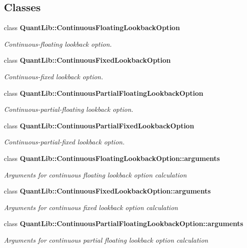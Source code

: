 \subsection*{Classes}
\begin{DoxyCompactItemize}
\item 
class {\bf Quant\+Lib\+::\+Continuous\+Floating\+Lookback\+Option}
\begin{DoxyCompactList}\small\item\em Continuous-\/floating lookback option. \end{DoxyCompactList}\item 
class {\bf Quant\+Lib\+::\+Continuous\+Fixed\+Lookback\+Option}
\begin{DoxyCompactList}\small\item\em Continuous-\/fixed lookback option. \end{DoxyCompactList}\item 
class {\bf Quant\+Lib\+::\+Continuous\+Partial\+Floating\+Lookback\+Option}
\begin{DoxyCompactList}\small\item\em Continuous-\/partial-\/floating lookback option. \end{DoxyCompactList}\item 
class {\bf Quant\+Lib\+::\+Continuous\+Partial\+Fixed\+Lookback\+Option}
\begin{DoxyCompactList}\small\item\em Continuous-\/partial-\/fixed lookback option. \end{DoxyCompactList}\item 
class {\bf Quant\+Lib\+::\+Continuous\+Floating\+Lookback\+Option\+::arguments}
\begin{DoxyCompactList}\small\item\em Arguments for continuous floating lookback option calculation \end{DoxyCompactList}\item 
class {\bf Quant\+Lib\+::\+Continuous\+Fixed\+Lookback\+Option\+::arguments}
\begin{DoxyCompactList}\small\item\em Arguments for continuous fixed lookback option calculation \end{DoxyCompactList}\item 
class {\bf Quant\+Lib\+::\+Continuous\+Partial\+Floating\+Lookback\+Option\+::arguments}
\begin{DoxyCompactList}\small\item\em Arguments for continuous partial floating lookback option calculation \end{DoxyCompactList}\item 

\end{DoxyCompactItemize}
